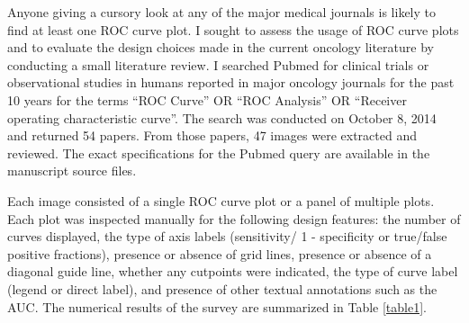 \documentclass[codesnippet]{jss}
\begin{document}
Anyone giving a cursory look at any of the major medical journals is
likely to find at least one ROC curve plot. I sought to assess the usage
of ROC curve plots and to evaluate the design choices made in the
current oncology literature by conducting a small literature review. I
searched Pubmed for clinical trials or observational studies in humans
reported in major oncology journals for the past 10 years for the terms
``ROC Curve'' OR ``ROC Analysis'' OR ``Receiver operating characteristic
curve''. The search was conducted on October 8, 2014 and returned 54
papers. From those papers, 47 images were extracted and reviewed. The
exact specifications for the Pubmed query are available in the
manuscript source files.

Each image consisted of a single ROC curve plot or a panel of multiple
plots. Each plot was inspected manually for the following design
features: the number of curves displayed, the type of axis labels
(sensitivity/ 1 - specificity or true/false positive fractions),
presence or absence of grid lines, presence or absence of a diagonal
guide line, whether any cutpoints were indicated, the type of curve
label (legend or direct label), and presence of other textual
annotations such as the AUC. The numerical results of the survey are
summarized in Table \ref{table1}.
\end{document}
